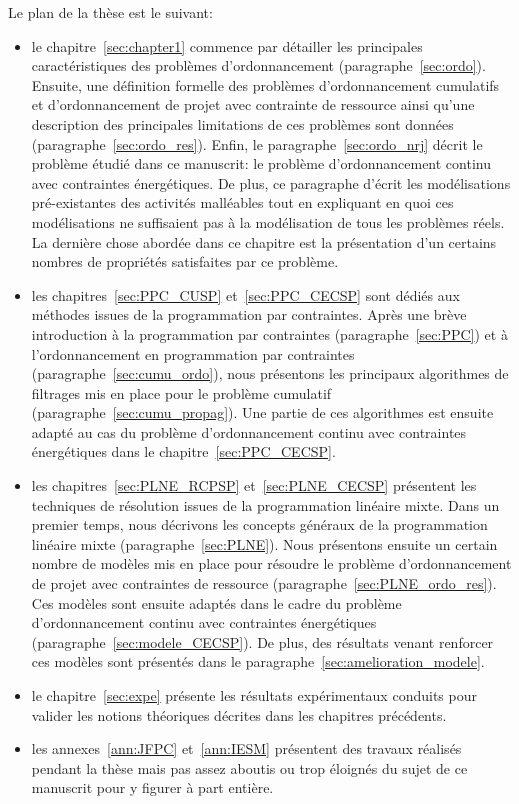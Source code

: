 Le plan de la thèse est le suivant: 
\begin{itemize}
\item le chapitre~\ref{sec:chapter1} commence par détailler les
principales caractéristiques des problèmes d'ordonnancement
(paragraphe~\ref{sec:ordo}). Ensuite, une définition formelle des
problèmes d'ordonnancement cumulatifs et d'ordonnancement de projet
avec contrainte de ressource ainsi qu'une description des principales
limitations de ces problèmes sont données
(paragraphe~\ref{sec:ordo_res}).  Enfin, le
paragraphe~\ref{sec:ordo_nrj} décrit le problème étudié dans ce
manuscrit: le problème d'ordonnancement continu avec contraintes
énergétiques. De plus, ce paragraphe d'écrit les modélisations
pré-existantes des activités malléables tout en expliquant en quoi ces
modélisations ne suffisaient pas à la modélisation de tous les problèmes
réels. La dernière chose abordée dans ce chapitre est la présentation
d'un certains nombres de propriétés satisfaites par ce problème.
\item les chapitres~\ref{sec:PPC_CUSP} et~\ref{sec:PPC_CECSP} sont
  dédiés aux méthodes issues de la programmation par
  contraintes. Après une brève introduction à la programmation par
  contraintes (paragraphe~\ref{sec:PPC}) et à l'ordonnancement en
  programmation par contraintes (paragraphe~\ref{sec:cumu_ordo}), nous
  présentons les principaux algorithmes de filtrages mis en place pour
  le problème cumulatif (paragraphe~\ref{sec:cumu_propag}). Une partie
  de ces algorithmes est ensuite adapté au cas du problème
  d'ordonnancement continu avec contraintes énergétiques dans le
  chapitre~\ref{sec:PPC_CECSP}. 
\item les chapitres~\ref{sec:PLNE_RCPSP} et~\ref{sec:PLNE_CECSP}
  présentent les techniques de résolution issues de la programmation
  linéaire mixte. Dans un premier temps, nous décrivons les concepts généraux
  de la programmation linéaire mixte (paragraphe~\ref{sec:PLNE}). Nous
  présentons ensuite un certain nombre de modèles mis en place pour
  résoudre le problème d'ordonnancement de projet avec contraintes de
  ressource (paragraphe~\ref{sec:PLNE_ordo_res}). Ces modèles sont
  ensuite adaptés dans le cadre du problème d'ordonnancement continu
avec contraintes énergétiques (paragraphe~\ref{sec:modele_CECSP}). De
plus, des résultats venant renforcer ces modèles sont présentés dans
le paragraphe~\ref{sec:amelioration_modele}.
\item le chapitre~\ref{sec:expe} présente les résultats expérimentaux
  conduits pour valider les notions théoriques décrites dans les
  chapitres précédents. 
\item les annexes~\ref{ann:JFPC} et~\ref{ann:IESM} présentent des
  travaux réalisés pendant la thèse mais pas assez aboutis ou trop
  éloignés du sujet de ce manuscrit pour y figurer à part entière. 
\end{itemize}










